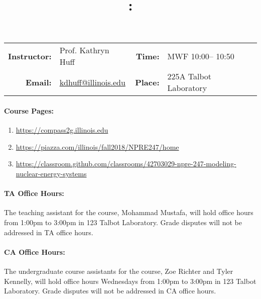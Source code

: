 \documentclass[11pt, a4paper]{article}
\title{\CourseNumber: \CourseTitle\\}
\author{\CourseUniversity}
\date{\CourseSemester \CourseYear}
\makeatletter
\newcommand{\CourseNumber}{NPRE247}
\newcommand{\CourseInstructor}{Prof. Kathryn Huff\xspace}%
\newcommand{\CourseDays}{MWF\xspace}%
\newcommand{\CourseStart}{10:00\xspace}%
\newcommand{\CourseEnd}{10:50\xspace}%
\newcommand{\CourseInstructorEmail}{kdhuff@illinois.edu}
\newcommand{\CourseRoom}{225A\xspace}%
\newcommand{\CourseBuilding}{Talbot Laboratory\xspace}%
\newcommand{\TeachingAssistant}{Mohammad Mustafa\xspace}%
\newcommand{\TAOfficeHourDays}{\xspace}%
\newcommand{\TAOfficeHourStart}{1:00pm\xspace}%
\newcommand{\TAOfficeHourEnd}{3:00pm\xspace}%
\newcommand{\TAOfficeHourPlace}{123 Talbot Laboratory\xspace}
\newcommand{\CourseAssistants}{Zoe Richter and Tyler Kennelly\xspace}%
\newcommand{\CAOfficeHourDays}{Wednesdays\xspace}%
\newcommand{\CAOfficeHourStart}{1:00pm\xspace}%
\newcommand{\CAOfficeHourEnd}{3:00pm\xspace}%
\newcommand{\CAOfficeHourPlace}{123 Talbot Laboratory\xspace}
\makeatother
\begin{document}
\maketitle
\renewcommand{\arraystretch}{1.5}
\begin{center}
\begin{table}[h]
\begin{tabularx}{\textwidth}{rXrX}
\hline
\textbf{Instructor:} & \CourseInstructor & \textbf{Time:} & \CourseDays \CourseStart -- \CourseEnd \\
\textbf{Email:} &  \href{mailto:\CourseInstructorEmail}{\CourseInstructorEmail} & \textbf{Place:} & \CourseRoom \CourseBuilding\\
\hline
\end{tabularx}
\end{table}
\end{center}

\paragraph{Course Pages:}
\begin{enumerate}
        \item \url{https://compass2g.illinois.edu}
        \item \url{https://piazza.com/illinois/fall2018/\CourseNumber/home}
        \item \url{https://classroom.github.com/classrooms/42703029-npre-247-modeling-nuclear-energy-systems}
\end{enumerate}

\paragraph{TA Office Hours:} The teaching assistant for the course, 
\TeachingAssistant, will hold office hours \TAOfficeHourDays from 
\TAOfficeHourStart to \TAOfficeHourEnd in \TAOfficeHourPlace. 
Grade disputes will not be addressed in TA office hours. 

\paragraph{CA Office Hours:} The undergraduate course assistants for the course, 
\CourseAssistants, will hold office hours \CAOfficeHourDays from 
\CAOfficeHourStart to \CAOfficeHourEnd in \CAOfficeHourPlace.
Grade disputes will not be addressed in CA office hours. 
\end{document}
